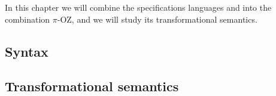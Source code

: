 In this chapter we will combine the specifications languages \oz{} and \picalc{} into the combination $\pi$-OZ, and we will study its transformational semantics.
\subsection{Syntax}
\label{sec_comp_oz_pi_syntax}


\subsection{Transformational semantics}
\label{sec_comp_oz_pi_transformational_semantics}


